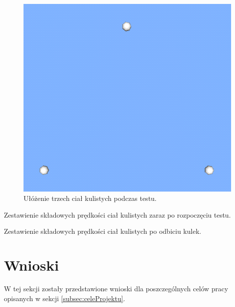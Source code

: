 \begin{figure}[H]
\centering
\includegraphics[scale=0.5]{img/ThreeBall.png}
\caption{Ułóżenie trzech ciał kulistych podczas testu.}
\label{fig:ThreeBall}
\end{figure}

\newpage
\begin{table}[H]
\centering

\caption{Zestawienie składowych prędkości ciał kulistych zaraz po rozpoczęciu
testu.}
\label{tab:velocities}
\end{table}

\begin{table}[H]
\centering

\caption{Zestawienie składowych prędkości ciał kulistych po odbiciu kulek.}
\label{tab:velocities2}
\end{table}

\newpage
\section{Wnioski}
W tej sekcji zostały przedstawione wnioski dla poszczególnych celów pracy
opisanych w sekcji \ref{subsec:celeProjektu}. \\

